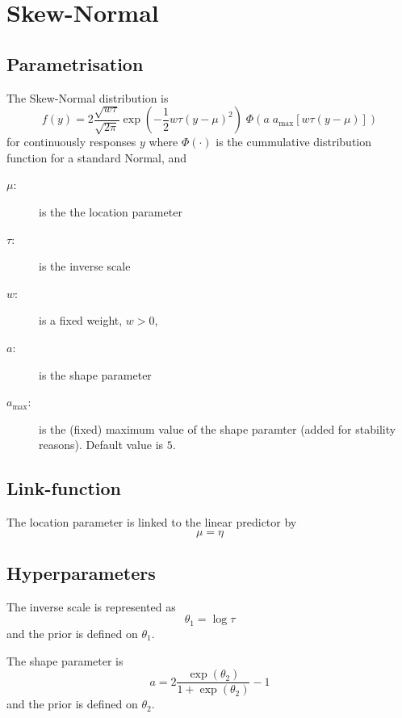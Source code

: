 \documentclass[a4paper,11pt]{article}
\begin{document}
\section*{Skew-Normal}

\subsection*{Parametrisation}

The Skew-Normal distribution is
\begin{displaymath}
    f(y) = 2\frac{\sqrt{w\tau}}{\sqrt{2\pi}} \exp\left( -\frac{1}{2}
      w\tau \left(y-\mu\right)^{2}\right) \; \Phi(a\; a_{\text{max}} \left[w\tau \left(y-\mu\right)\right])
\end{displaymath}
for continuously responses $y$ where $\Phi(\cdot)$ is the cummulative
distribution function for a standard Normal, and
\begin{description}
\item[$\mu$:] is the the location parameter
\item[$\tau$:] is the inverse scale
\item[$w$:] is a fixed weight, $w>0$,
\item[$a$:] is the shape parameter
\item[$a_{\text{max}}$:] is the (fixed) maximum value of the shape
    paramter (added for stability reasons). Default value is $5$.
\end{description}

\subsection*{Link-function}

The location parameter is linked to the linear predictor by
\begin{displaymath}
    \mu = \eta
\end{displaymath}

\subsection*{Hyperparameters}

The inverse scale is represented as
\begin{displaymath}
    \theta_{1} = \log \tau
\end{displaymath}
and the prior is defined on $\theta_{1}$. 

The shape parameter is 
\begin{displaymath}
    a = 2 \frac{\exp(\theta_{2})}{1+\exp(\theta_{2})}-1
\end{displaymath}
and the prior is defined on $\theta_{2}$. 
\end{document}
